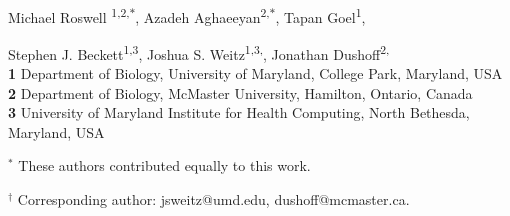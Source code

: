 \begin{flushleft}
	{\Large
		\textbf{} %
	}
	\newline
	\\
	Michael Roswell \textsuperscript{1,2,$*$}, 
    Azadeh Aghaeeyan\textsuperscript{2,$*$},
	Tapan Goel\textsuperscript{1}, 
	
	Stephen J. Beckett\textsuperscript{1,3}, 
	Joshua S. Weitz\textsuperscript{1,3,\dag}, 
    Jonathan Dushoff\textsuperscript{2,\dag}
	\\
	\bigskip
	\textbf{1} Department of Biology, University of Maryland, College Park, Maryland, USA
	\\
	\textbf{2} Department of Biology, McMaster University, Hamilton, Ontario, Canada
	\\
	\textbf{3} University of Maryland Institute for Health Computing, North Bethesda, Maryland, USA
	\\
	\bigskip
	
	 $^*$ These authors contributed equally to this work.
     
  $^\dag$ Corresponding author:  jsweitz@umd.edu, dushoff@mcmaster.ca.
	
	
	
	
	
	
\end{flushleft}

